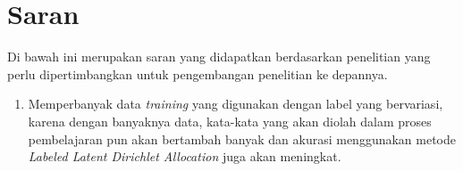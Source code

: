 \section{Saran}
\indent
Di bawah ini merupakan saran yang didapatkan berdasarkan penelitian yang perlu dipertimbangkan untuk pengembangan penelitian ke depannya.

\begin{enumerate}[nolistsep,leftmargin=0.5cm]
\item
Memperbanyak data {\itshape training} yang digunakan dengan label yang bervariasi, karena dengan banyaknya data, kata-kata yang akan diolah dalam proses pembelajaran pun akan bertambah banyak dan akurasi menggunakan metode {\itshape Labeled Latent Dirichlet Allocation} juga akan meningkat.

\end{enumerate}

\newpage